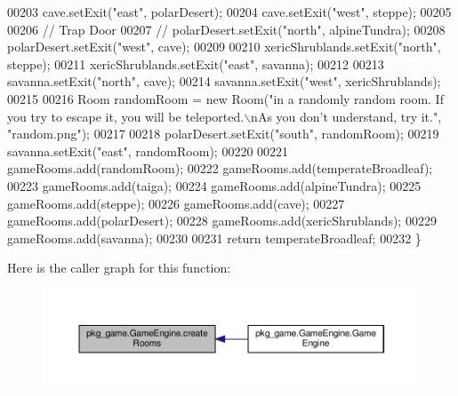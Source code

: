 \begin{DoxyCode}
00203         cave.setExit(\textcolor{stringliteral}{"east"}, polarDesert);
00204         cave.setExit(\textcolor{stringliteral}{"west"}, steppe);
00205 
00206         \textcolor{comment}{// Trap Door}
00207         \textcolor{comment}{// polarDesert.setExit("north", alpineTundra);}
00208         polarDesert.setExit(\textcolor{stringliteral}{"west"}, cave);
00209 
00210         xericShrublands.setExit(\textcolor{stringliteral}{"north"}, steppe);
00211         xericShrublands.setExit(\textcolor{stringliteral}{"east"}, savanna);
00212 
00213         savanna.setExit(\textcolor{stringliteral}{"north"}, cave);
00214         savanna.setExit(\textcolor{stringliteral}{"west"}, xericShrublands);
00215 
00216         Room randomRoom = \textcolor{keyword}{new} Room(\textcolor{stringliteral}{"in a randomly random room. If you try to escape it, you will be
       teleported.\(\backslash\)nAs you don't understand, try it."}, \textcolor{stringliteral}{"random.png"});
00217 
00218         polarDesert.setExit(\textcolor{stringliteral}{"south"}, randomRoom);
00219         savanna.setExit(\textcolor{stringliteral}{"east"}, randomRoom);
00220 
00221         gameRooms.add(randomRoom);
00222         gameRooms.add(temperateBroadleaf);
00223         gameRooms.add(taiga);
00224         gameRooms.add(alpineTundra);
00225         gameRooms.add(steppe);
00226         gameRooms.add(cave);
00227         gameRooms.add(polarDesert);
00228         gameRooms.add(xericShrublands);
00229         gameRooms.add(savanna);
00230 
00231         \textcolor{keywordflow}{return} temperateBroadleaf;
00232     \}
\end{DoxyCode}


Here is the caller graph for this function\-:
\nopagebreak
\begin{figure}[H]
\begin{center}
\leavevmode
\includegraphics[width=350pt]{classpkg__game_1_1GameEngine_a986180eff9d235e3b619c7403accfc31_icgraph}
\end{center}
\end{figure}


